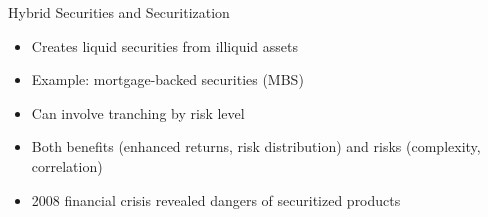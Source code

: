 \documentclass[10pt]{beamer}
\begin{document}
\begin{frame}{Hybrid Securities and Securitization}
\begin{itemize}[<+->]
      \begin{itemize}
        \item Creates liquid securities from illiquid assets
        \item Example: mortgage-backed securities (MBS)
        \item Can involve tranching by risk level
        \item Both benefits (enhanced returns, risk distribution) and risks (complexity, correlation)
        \item 2008 financial crisis revealed dangers of securitized products
      \end{itemize}
  \end{itemize}
\end{frame}
\end{document}
